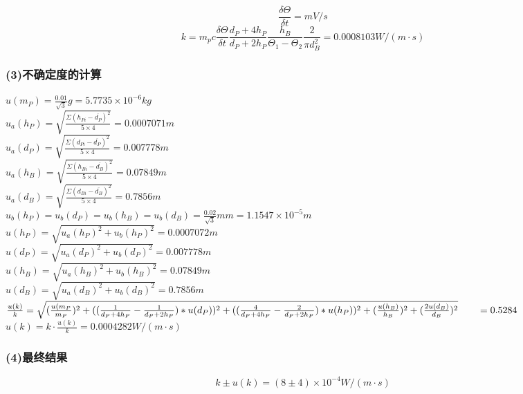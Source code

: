 \documentclass[11pt,a4paper,oneside]{article}
\begin{document}
$$\frac{\delta\Theta}{\delta t} = mV/s$$
$$k = m_pc\frac{\delta\Theta}{\delta t}\frac{d_P+4h_P}{d_P+2h_P}\frac{h_B}{\Theta_1-\Theta_2}\frac{2}{\pi d_B^2} = 0.0008103 W/(m\cdot s)$$

\subsubsection*{(3)不确定度的计算}
\noindent
$\displaystyle u(m_P) = \frac{0.01}{\sqrt3}g = 5.7735\times 10^{-6}kg$ \\

\noindent
$\displaystyle u_a(h_P) = \sqrt{\frac{\Sigma(h_{Pi} - \overline{d_P})^2}{ 5 \times 4 } } = 0.0007071m$ \\
$\displaystyle u_a(d_P) = \sqrt{\frac{\Sigma(d_{Pi} - \overline{d_P})^2}{ 5 \times 4 } } = 0.007778m$ \\
$\displaystyle u_a(h_B) = \sqrt{\frac{\Sigma(h_{Bi} - \overline{d_B})^2}{ 5 \times 4 } } = 0.07849m$ \\
$\displaystyle u_a(d_B) = \sqrt{\frac{\Sigma(d_{Bi} - \overline{d_B})^2}{ 5 \times 4 } } = 0.7856m$ \\
$\displaystyle u_b(h_P) = u_b(d_P) = u_b(h_B) = u_b(d_B) = \frac{0.02}{\sqrt 3}mm = 1.1547\times10^{-5}m$ \\

\noindent
$\displaystyle u(h_P) = \sqrt{u_a(h_P)^2 + u_b(h_P)^2} = 0.0007072m$ \\
$\displaystyle u(d_P) = \sqrt{u_a(d_P)^2 + u_b(d_P)^2} = 0.007778m$ \\
$\displaystyle u(h_B) = \sqrt{u_a(h_B)^2 + u_b(h_B)^2} = 0.07849m$ \\
$\displaystyle u(d_B) = \sqrt{u_a(d_B)^2 + u_b(d_B)^2} = 0.7856m$ \\

\noindent
$\frac{u(k)}{k} = \sqrt{(\frac{u(m_P}{m_P})^2 + ((\frac{1}{d_P + 4h_P} - \frac{1}{d_P + 2h_P}) * u(d_P))^2 + ((\frac{4}{d_P + 4h_P} - \frac{2}{d_P + 2h_P}) * u(h_P))^2 + (\frac{u(h_B)}{h_B})^2 + (\frac{2u(d_B)}{d_B})^2} \\ \qquad = 0.5284$ \\

\noindent
$\displaystyle u(k) = k\cdot\frac{u(k)}{k} = 0.0004282W/(m\cdot s)$ \\


\subsubsection*{(4)最终结果}
\noindent
$$k \pm u(k) = (8\pm4){\times}10^{-4} W/(m\cdot s)$$
\end{document}
